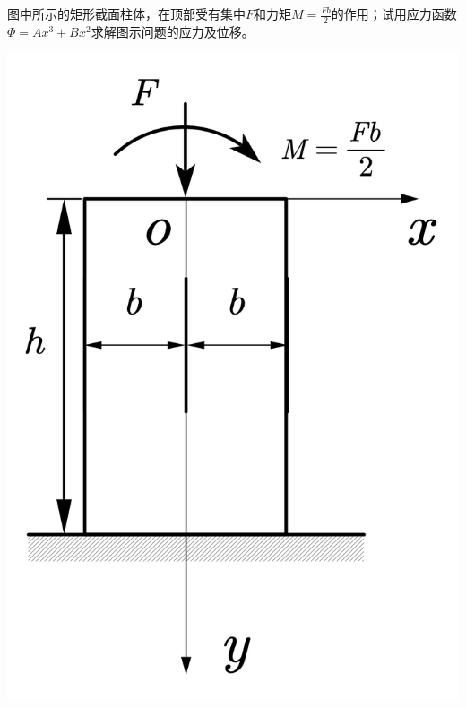 \begin{example}
	图中所示的矩形截面柱体，在顶部受有集中$F$和力矩$M=\frac{Fb}{2}$的作用；试用应力函数$\varPhi =Ax^3+Bx^2$求解图示问题的应力及位移。
\end{example}
\centerline{\includegraphics[scale=0.6]{figure/3-8.png}}
